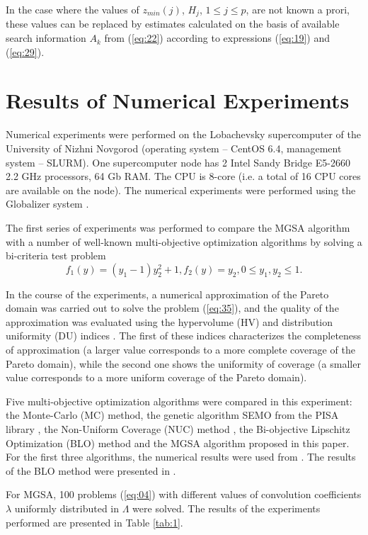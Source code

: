 \documentclass[runningheads]{llncs}
\begin{document}
In the case where the values of $z_{min} (j)$, $H_j$, $1 \leq j \leq p$, are not known a prori, these values can be replaced by estimates calculated on the basis of available search information $A_k$ from (\ref{eq:22}) according to expressions (\ref{eq:19}) and (\ref{eq:29}).


\section{Results of Numerical Experiments} \label{sec:05}

Numerical experiments were performed on the Lobachevsky supercomputer of the University of Nizhni Novgorod (operating system -- CentOS 6.4, management system -- SLURM). One supercomputer node has 2 Intel Sandy Bridge E5-2660 2.2 GHz processors, 64 Gb RAM. The CPU is 8-core (i.e. a total of 16 CPU cores are available on the node). The numerical experiments were performed using the Globalizer system \cite{c38}.

      The first series of experiments was performed to compare the MGSA algorithm with a number of well-known multi-objective optimization algorithms by solving a bi-criteria test problem \cite{c40}
\begin{equation}
\label{eq:35}
f_1 (y)=(y_1-1) y_2^2+1,f_2 (y)=y_2, 0 \leq y_1, y_2 \leq 1.
\end{equation}

In the course of the experiments, a numerical approximation of the Pareto domain was carried out to solve the problem (\ref{eq:35}), and the quality of the approximation was evaluated using the hypervolume (HV) and distribution uniformity (DU) indices \cite{c37,c40}. The first of these indices characterizes the completeness of approximation (a larger value corresponds to a more complete coverage of the Pareto domain), while the second one shows the uniformity of coverage (a smaller value corresponds to a more uniform coverage of the Pareto domain).

Five multi-objective optimization algorithms were compared in this experiment: the Monte-Carlo (MC) method, the genetic algorithm SEMO from the PISA library \cite{c42}, the Non-Uniform Coverage (NUC) method \cite{c40}, the Bi-objective Lipschitz Optimization (BLO) method \cite{c39} and the MGSA algorithm proposed in this paper. For the first three algorithms, the numerical results were used from \cite{c41}. The results of the BLO method were presented in \cite{c39}.

For MGSA, 100 problems (\ref{eq:04}) with different values of convolution coefficients $\lambda$ uniformly distributed in $\Lambda$ were solved. The results of the experiments performed are presented in Table \ref{tab:1}.
\end{document}
